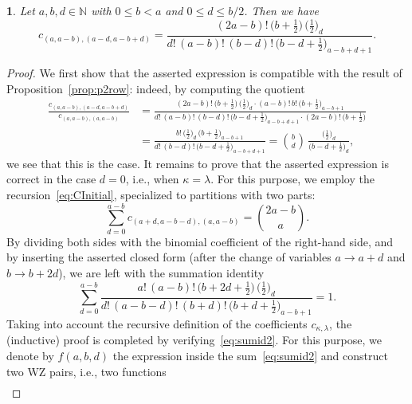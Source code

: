 \documentclass[smallextended]{svjour3}
\newtheorem{thm}{\protect\theoremname}
\providecommand{\theoremname}{Theorem}
\begin{document}
\begin{thm}\label{thm:cf2}
  Let $a,b,d\in\mathbb{N}$ with $0\leq b<a$ and $0\leq d\leq b/2$.
  Then we have
  \[
    c_{(a,a-b),(a-d,a-b+d)} = 
    \frac{(2a-b)! \, \bigl(b+\frac12\bigr) \, \bigl(\frac12\bigr)_{\!d}}
         {d! \, (a-b)! \, (b-d)! \, \bigl(b-d+\frac12\bigr)_{\!a-b+d+1}}.
  \]
\end{thm}
\begin{proof}
  We first show that the asserted expression is compatible with the result of
  Proposition~\ref{prop:p2row}: indeed, by computing the quotient
  \begin{align*}
    \frac{c_{(a,a-b),(a-d,a-b+d)}}{c_{(a,a-b),(a,a-b)}} &=
    \frac{(2a-b)! \, \bigl(b+\frac12\bigr) \, \bigl(\frac12\bigr)_{\!d} \cdot
      (a-b)! \, b! \, \bigl(b+\frac12\bigr)_{\!a-b+1}}
      {d! \, (a-b)! \, (b-d)! \, \bigl(b-d+\frac12\bigr)_{\!a-b+d+1} \!\cdot
        (2a-b)! \, \bigl(b+\frac12\bigr)} \\
    &= \frac{b! \, \bigl(\frac12\bigr)_{\!d} \, \bigl(b+\frac12\bigr)_{\!a-b+1}}
      {d! \, (b-d)! \, \bigl(b-d+\frac12\bigr)_{\!a-b+d+1}}
    = \binom{b}{d}\,\frac{\bigl(\frac12\bigr)_{\!d}}{\bigl(b-d+\frac12\bigr)_{\!d}},
  \end{align*}
  we see that this is the case. It remains to prove that the asserted
  expression is correct in the case $d=0$, i.e., when $\kappa=\lambda$.  For
  this purpose, we employ the recursion~\eqref{eq:CInitial}, specialized to
  partitions with two parts:
  \begin{equation}\label{eq:CInitial2}
    \sum_{d=0}^{a-b} c_{(a+d,a-b-d),(a,a-b)} = \binom{2a-b}{a}.
  \end{equation}
  By dividing both sides with the binomial coefficient of the right-hand side,
  and by inserting the asserted closed form (after the change of variables
  $a\to a+d$ and $b\to b+2d$), we are left with the summation identity
  \begin{equation}\label{eq:sumid2}
    \sum_{d=0}^{a-b}
    \frac{a! \, (a-b)! \, \bigl(b+2d+\frac{1}{2}\bigr) \, \bigl(\frac{1}{2}\bigr)_{\!d}}
         {d! \, (a-b-d)! \, (b+d)! \, \bigl(b+d+\frac12\bigr)_{\!a-b+1}} = 1.
  \end{equation}
  Taking into account the recursive definition of the coefficients
  $c_{\kappa,\lambda}$, the (inductive) proof is completed by
  verifying~\eqref{eq:sumid2}.
  For this purpose, we denote by $f(a,b,d)$ the expression inside the
  sum~\eqref{eq:sumid2} and construct two WZ pairs, i.e., two functions
  \begin{align*}

\end{align*}
\end{proof}
\end{document}
